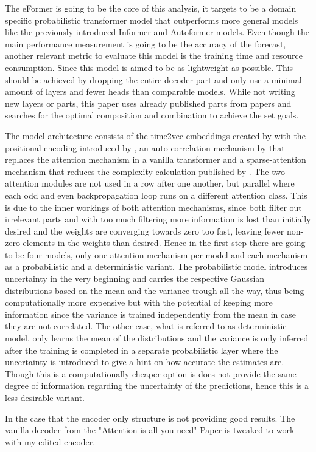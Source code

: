 \documentclass{article}
\begin{document}
The eFormer is going to be the core of this analysis, it targets to be a domain specific probabilistic transformer model that outperforms more general models like the previously introduced Informer and Autoformer models. Even though the main performance measurement is going to be the accuracy of the forecast, another relevant metric to evaluate this model is the training time and resource consumption. Since this model is aimed to be as lightweight as possible. This should be achieved by dropping the entire decoder part and only use a minimal amount of layers and fewer heads than comparable models. While not writing new layers or parts, this paper uses already published parts from papers and searches for the optimal composition and combination to achieve the set goals. \par
The model architecture consists of the time2vec embeddings created by \cite{time2vec} with the positional encoding introduced by \cite{vanilla-transformer}, an auto-correlation mechanism by \cite{autoformer} that replaces the attention mechanism in a vanilla transformer and a sparse-attention mechanism that reduces the complexity calculation published by \cite{Informer}. The two attention modules are not used in a row after one another, but parallel where each odd and even backpropagation loop runs on a different attention class. This is due to the inner workings of both attention mechanisms, since both filter out irrelevant parts and with too much filtering more information is lost than initially desired and the weights are converging towards zero too fast, leaving fewer non-zero elements in the weights than desired. Hence in the first step there are going to be four models, only one attention mechanism per model and each mechanism as a probabilistic and a deterministic variant. The probabilistic model introduces uncertainty in the very beginning and carries the respective Gaussian distributions based on the mean and the variance trough all the way, thus being computationally more expensive but with the potential of keeping more information since the variance is trained independently from the mean in case they are not correlated. The other case, what is referred to as deterministic model, only learns the mean of the distributions and the variance is only inferred after the training is completed in a separate probabilistic layer where the uncertainty is introduced to give a hint on how accurate the estimates are. Though this is a computationally cheaper option is does not provide the same degree of information regarding the uncertainty of the predictions, hence this is a less desirable variant. \par 
In the case that the encoder only structure is not providing good results. The vanilla decoder from the "Attention is all you need" Paper is tweaked to work with my edited encoder.
\end{document}
